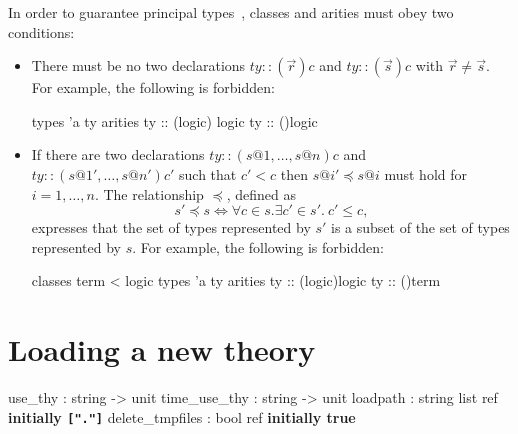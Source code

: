 In order to guarantee principal types~\cite{nipkow-prehofer},
classes and arities must obey two conditions:
\begin{itemize}
\item There must be no two declarations $ty :: (\vec{r})c$ and $ty ::
  (\vec{s})c$ with $\vec{r} \neq \vec{s}$.  For example, the following is
  forbidden:
\begin{ttbox}
types 'a ty
arities ty :: ({\ttlbrace}logic{\ttrbrace}) logic
        ty :: ({\ttlbrace}{\ttrbrace})logic
\end{ttbox}

\item If there are two declarations $ty :: (s@1,\dots,s@n)c$ and $ty ::
  (s@1',\dots,s@n')c'$ such that $c' < c$ then $s@i' \preceq s@i$ must hold
  for $i=1,\dots,n$.  The relationship $\preceq$, defined as
\[ s' \preceq s \iff \forall c\in s. \exists c'\in s'.~ c'\le c, \]
expresses that the set of types represented by $s'$ is a subset of the set of
types represented by $s$.  For example, the following is forbidden:
\begin{ttbox}
classes term < logic
types 'a ty
arities ty :: ({\ttlbrace}logic{\ttrbrace})logic
        ty :: ({\ttlbrace}{\ttrbrace})term
\end{ttbox}

\end{itemize}


\section{Loading a new theory}
\label{LoadingTheories}
\begin{ttbox} 
use_thy         : string -> unit
time_use_thy    : string -> unit
loadpath        : string list ref \hfill{\bf initially {\tt["."]}}
delete_tmpfiles : bool ref \hfill{\bf initially true}
\end{ttbox}

